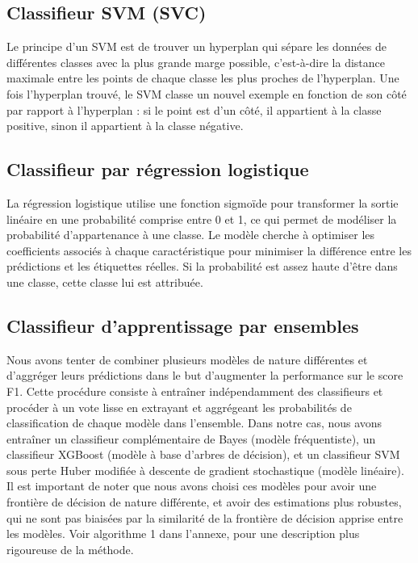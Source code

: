 \documentclass{article}
\begin{document}
\subsection{Classifieur SVM (SVC)}
Le principe d'un SVM est de trouver un hyperplan qui sépare les données de différentes classes avec la plus grande marge possible, c'est-à-dire la distance maximale entre les points de chaque classe les plus proches de l'hyperplan. Une fois l'hyperplan trouvé, le SVM classe un nouvel exemple en fonction de son côté par rapport à l'hyperplan : si le point est d’un côté, il appartient à la classe positive, sinon il appartient à la classe négative.

\subsection{Classifieur par régression logistique}
La régression logistique utilise une fonction sigmoïde pour transformer la sortie linéaire en une probabilité comprise entre 0 et 1, ce qui permet de modéliser la probabilité d'appartenance à une classe. Le modèle cherche à optimiser les coefficients associés à chaque caractéristique pour minimiser la différence entre les prédictions et les étiquettes réelles. Si la probabilité est assez haute d'être dans une classe, cette classe lui est attribuée.

\subsection{Classifieur d'apprentissage par ensembles}
Nous avons tenter de combiner plusieurs modèles de nature différentes et d'aggréger leurs prédictions dans le but d'augmenter la performance sur le score F1. Cette procédure consiste à entraîner indépendamment des classifieurs et procéder à un vote lisse en extrayant et aggrégeant les probabilités de classification de chaque modèle dans l'ensemble. Dans notre cas, nous avons entraîner un classifieur complémentaire de Bayes (modèle fréquentiste), un classifieur XGBoost (modèle à base d'arbres de décision), et un classifieur SVM sous perte Huber modifiée à descente de gradient stochastique (modèle linéaire). Il est important de noter que nous avons choisi ces modèles pour avoir une frontière de décision de nature différente, et avoir des estimations plus robustes, qui ne sont pas biaisées par la similarité de la frontière de décision apprise entre les modèles. Voir algorithme 1 dans l'annexe, pour une description plus rigoureuse de la méthode.
\end{document}
